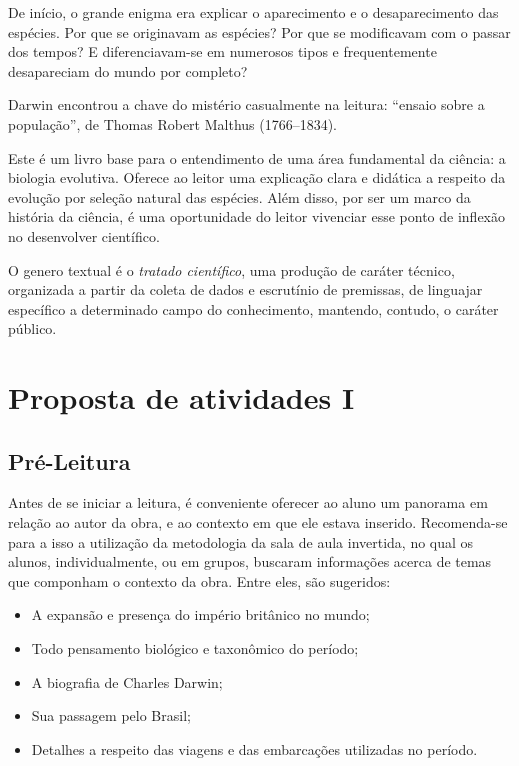 \documentclass[12pt]{extarticle}
\begin{document}
De início, o grande enigma era explicar o aparecimento e o desaparecimento das
espécies. Por que se originavam as espécies? Por que se modificavam com o passar dos tempos? E diferenciavam-se em numerosos tipos e frequentemente desapareciam do mundo por completo?

Darwin encontrou a chave do mistério  casualmente na leitura: ``ensaio sobre
a população'', de Thomas Robert Malthus (1766--1834).

Este é um livro base para o entendimento de uma área fundamental da ciência:
a biologia evolutiva.
Oferece ao leitor uma explicação clara e didática a respeito da evolução por
seleção natural das espécies.
Além disso,  por ser um marco da história da ciência, é uma oportunidade do
leitor vivenciar esse ponto de inflexão no desenvolver científico.



O genero textual  é o \textit{tratado científico}, uma produção de caráter
técnico,  organizada a partir da coleta de dados e escrutínio de premissas, de
linguajar específico a determinado campo do conhecimento,  mantendo, contudo,
o caráter público.
\section{Proposta de atividades I}


\subsection{Pré-Leitura}

Antes de se iniciar a leitura, é conveniente oferecer ao aluno um panorama em
relação ao autor da obra, e ao contexto em que ele estava inserido.
Recomenda-se para a isso a utilização da metodologia da sala de aula invertida,
no qual os alunos, individualmente, ou em grupos, buscaram informações acerca
de temas que componham o contexto da obra. Entre eles, são sugeridos:

\begin{itemize} \item A expansão e presença do império britânico no mundo;
    \item Todo pensamento biológico e taxonômico do período; \item A biografia
    de Charles Darwin; \item Sua passagem pelo Brasil; \item Detalhes
      a respeito das viagens e das embarcações utilizadas no período.
  \end{itemize}
\end{document}
